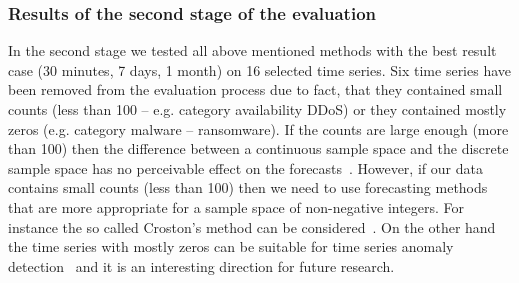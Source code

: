 \documentclass[runningheads]{llncs}
\begin{document}
\subsubsection{Results of the second stage of the evaluation}

In the second stage we tested all above mentioned methods with the best result case (30 minutes, 7 days, 1 month) on 16 selected time series. Six time series have been removed from the evaluation process due to fact, that they contained small counts (less than 100 -- e.g. category availability DDoS) or they contained mostly zeros (e.g. category malware -- ransomware). If the counts are large enough (more than 100) then the difference between a continuous sample space and the discrete sample space has no perceivable effect on the forecasts~\cite{hyndman2018forecasting}. However, if our data contains small counts (less than 100) then we need to use forecasting methods that are more appropriate for a sample space of non-negative integers. For instance the so called Croston's method can be considered~\cite{Croston1972ForecastingAS,Christou2015}. On the other hand the time series with mostly zeros can be suitable  for time series anomaly detection~\cite{mehrotra2017anomaly} and it is an interesting direction for future research.
\end{document}
